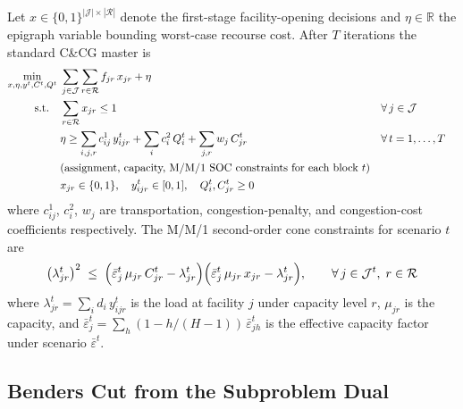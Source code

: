 Let $x \in \{0,1\}^{|\mathcal{J}|\times|\mathcal{R}|}$ denote the
first-stage facility-opening decisions and $\eta \in \mathbb{R}$ the
epigraph variable bounding worst-case recourse cost.
After $T$ iterations the standard C\&CG master is
\begin{align}
  \min_{x,\eta,y^t,C^t,Q^t}\;&
    \sum_{j\in\mathcal{J}}\sum_{r\in\mathcal{R}} f_{jr}\,x_{jr}
    + \eta
    \label{eq:master:obj}\\
  \text{s.t.}\quad&
    \sum_{r\in\mathcal{R}} x_{jr} \le 1
    && \forall\, j\in\mathcal{J}
    \label{eq:master:open}\\
  &\eta \ge
    \sum_{i,j,r} c^1_{ij}\,y^t_{ijr}
    + \sum_i c^2_i\,Q^t_i
    + \sum_{j,r} w_j\,C^t_{jr}
    && \forall\, t = 1,\ldots,T
    \label{eq:master:optcut}\\
  &\text{(assignment, capacity, M/M/1 SOC constraints for each block } t)
    \notag\\
  &x_{jr}\in\{0,1\},\quad
    y^t_{ijr}\in[0,1],\quad
    Q^t_i,C^t_{jr}\ge 0
    \notag
\end{align}
where $c^1_{ij}$, $c^2_i$, $w_j$ are transportation, congestion-penalty,
and congestion-cost coefficients respectively.
The M/M/1 second-order cone constraints for scenario $t$ are
\begin{equation}
  \left(\lambda^t_{jr}\right)^2
  \;\le\;
  \Bigl(\bar\varepsilon^t_j\,\mu_{jr}\,C^t_{jr} - \lambda^t_{jr}\Bigr)
  \Bigl(\bar\varepsilon^t_j\,\mu_{jr}\,x_{jr}   - \lambda^t_{jr}\Bigr),
  \qquad \forall\,j\in\mathcal{J}^t,\; r\in\mathcal{R}
  \label{eq:master:soc}
\end{equation}
where $\lambda^t_{jr} = \sum_i d_i\,y^t_{ijr}$ is the load at facility
$j$ under capacity level $r$, $\mu_{jr}$ is the capacity, and
$\bar\varepsilon^t_j = \sum_h (1 - h/(H-1))\,\bar\varepsilon^t_{jh}$
is the effective capacity factor under scenario $\bar\varepsilon^t$.

\subsection{Benders Cut from the Subproblem Dual}
\label{sec:rpbd:benders}

